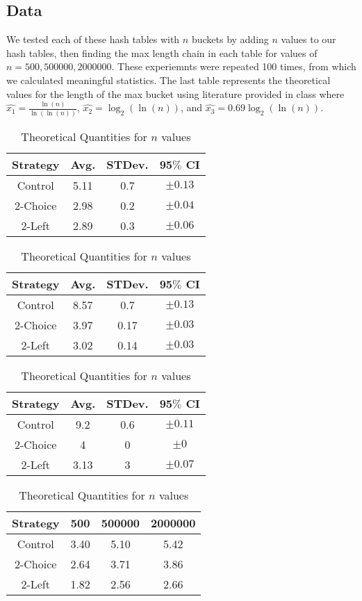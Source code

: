 \documentclass[11pt]{article}
\begin{document}
\subsection*{Data}
\vspace{-2mm}
We tested each of these hash tables with $n$ buckets by adding $n$ values to our hash tables, then finding the max length chain in each table for values of $n = 500, 500000, 2000000$. These experiemnts were repeated 100 times, from which we calculated meaningful statistics.
The last table represents the theoretical values for the length of the max bucket using literature provided in class where $\hat{x_{1}} = \frac{\ln(n)}{\ln(\ln(n))}$, $\hat{x_2} = \log_2(\ln(n))$, and $\hat{x_3} = 0.69\log_2(\ln(n))$.
\begin{table}[ht]
    \parbox{.45\linewidth}{
    \centering
    \begin{tabular}{|c c c c|} 
        \hline
        Strategy & Avg. & STDev. & 95$\%$ CI \\ [0.5ex] 
        \hline
        Control & 5.11 & 0.7 & $\pm 0.13$ \\ 
        \hline
        2-Choice& 2.98 & 0.2 & $\pm 0.04$ \\
        \hline
        2-Left & 2.89 & 0.3 & $\pm 0.06$ \\
        \hline
       \end{tabular}
    \caption{$n = 500$}
    \centering
    \begin{tabular}{|c c c c|} 
        \hline
        Strategy & Avg. & STDev. & 95$\%$ CI \\ [0.5ex]
        \hline
        Control & 8.57 & 0.7 & $\pm 0.13$ \\ 
        \hline
        2-Choice& 3.97 & 0.17 & $\pm 0.03$ \\
        \hline
        2-Left & 3.02 & 0.14 & $\pm 0.03$ \\
        \hline
       \end{tabular}
    \caption{$n = 500000$}
    \centering
    }
    \parbox{.45\linewidth}{
    \centering
    \begin{tabular}{|c c c c|} 
        \hline
        Strategy & Avg. & STDev. & 95$\%$ CI \\ [0.5ex]
        \hline
        Control & 9.2 & 0.6 & $\pm 0.11$ \\ 
        \hline
        2-Choice& 4 & 0& $\pm 0$ \\
        \hline
        2-Left & 3.13 & 3 & $\pm 0.07$ \\
        \hline
       \end{tabular}
    \caption{$n = 2000000$}
    \centering
    \begin{tabular}{|c c c c|} 
        \hline
        Strategy & 500 & 500000 & 2000000\\ [0.5ex]
        \hline
        Control & 3.40 & 5.10 & 5.42 \\ 
        \hline
        2-Choice& 2.64 & 3.71& 3.86 \\
        \hline
        2-Left & 1.82 & 2.56 & 2.66 \\
        \hline
       \end{tabular}
    \caption{Theoretical Quantities for $n$ values}
    }

\end{table}
\end{document}
